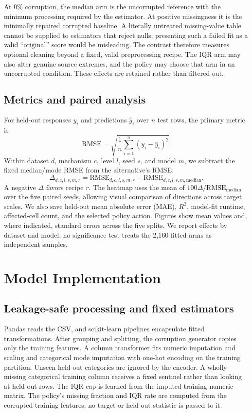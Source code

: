 \documentclass[conference]{IEEEtran}
\begin{document}
At 0\% corruption, the median arm is the uncorrupted reference with the minimum processing required by the estimator. At positive missingness it is the minimally repaired corrupted baseline. A literally untreated missing-value table cannot be supplied to estimators that reject nulls; presenting such a failed fit as a valid ``original'' score would be misleading. The contrast therefore measures optional cleaning beyond a fixed, valid preprocessing recipe. The IQR arm may also alter genuine source extremes, and the policy may choose that arm in an uncorrupted condition. These effects are retained rather than filtered out.

\subsection{Metrics and paired analysis}
For held-out responses $y_i$ and predictions $\hat y_i$ over $n$ test rows, the primary metric is
\begin{equation}
\mathrm{RMSE}=\sqrt{\frac{1}{n}\sum_{i=1}^{n}(y_i-\hat y_i)^2}.
\end{equation}
Within dataset $d$, mechanism $c$, level $l$, seed $s$, and model $m$, we subtract the fixed median/mode RMSE from the alternative's RMSE:
\begin{equation}
\Delta_{d,c,l,s,m,r}=\mathrm{RMSE}_{d,c,l,s,m,r}-\mathrm{RMSE}_{d,c,l,s,m,\mathrm{median}}.
\end{equation}
A negative $\Delta$ favors recipe $r$. The heatmap uses the mean of $100\Delta/\mathrm{RMSE}_{\mathrm{median}}$ over the five paired seeds, allowing visual comparison of directions across target scales. We also save held-out mean absolute error (MAE), $R^2$, model-fit runtime, affected-cell count, and the selected policy action. Figures show mean values and, where indicated, standard errors across the five splits. We report effects by dataset and model; no significance test treats the 2,160 fitted arms as independent samples.

\section{Model Implementation}
\subsection{Leakage-safe processing and fixed estimators}
Pandas reads the CSV, and scikit-learn pipelines encapsulate fitted transformations. After grouping and splitting, the corruption generator copies only the training features. A column transformer fits numeric imputation and scaling and categorical mode imputation with one-hot encoding on the training partition. Unseen held-out categories are ignored by the encoder. A wholly missing categorical training column receives a fixed sentinel rather than looking at held-out rows. The IQR cap is learned from the imputed training numeric matrix. The policy's missing fraction and IQR rate are computed from the corrupted training features; no target or held-out statistic is passed to it.
\end{document}

